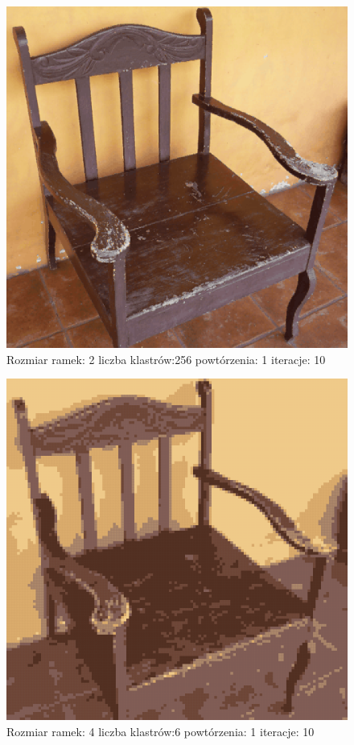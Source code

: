 \documentclass{classrep}
\begin{document}
{{{{\begin{figure}[!htbp]
\centering
\includegraphics[width=\textwidth,width=90mm]{obrazy/chair_R2_K256_P1_It10.png}
\caption{Rozmiar ramek: 2 liczba klastrów:256 powtórzenia: 1 iteracje: 10 }
\end{figure}

\begin{figure}[!htbp]
\centering
\includegraphics[width=\textwidth,width=90mm]{obrazy/chair_R4_K6_P1_It10.png}
\caption{Rozmiar ramek: 4 liczba klastrów:6 powtórzenia: 1 iteracje: 10 }
\end{figure}

}}}}
\end{document}
